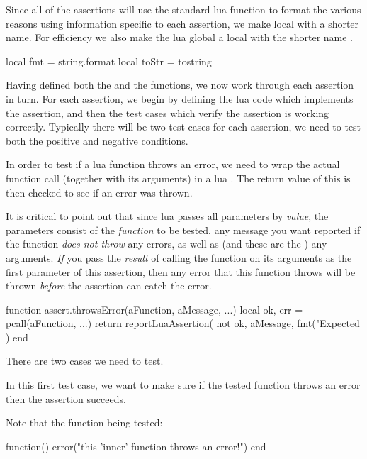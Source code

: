 Since all of the assertions will use the standard lua  
function to format the various reasons using information specific to each 
assertion, we make  local with a shorter name. For 
efficiency we also make the lua global  a local with the 
shorter name . 

\startLuaCode
local fmt   = string.format
local toStr = tostring
\stopLuaCode

Having defined both the  and the  
functions, we now work through each assertion in turn. For each assertion, 
we begin by defining the lua code which implements the assertion, and then 
the test cases which verify the assertion is working correctly. Typically 
there will be two test cases for each assertion, we need to test both the 
positive and negative conditions. 


In order to test if a lua function throws an error, we need to wrap the 
actual function call (together with its arguments) in a lua . 
The return value of this  is then checked to see if an error 
was thrown. 

It is critical to point out that since lua passes all parameters by 
\emph{value}, the  parameters consist of the 
\emph{function} to be tested, any message you want reported if the 
function \emph{does not throw} any errors, as well as (and these are the 
) any arguments. \emph{If} you pass the \emph{result} of 
calling the function on its arguments as the first parameter of this 
assertion, then any error that this function throws will be thrown 
\emph{before} the assertion can catch the error. 

\startLuaCode
function assert.throwsError(aFunction, aMessage, ...)
  local ok, err = pcall(aFunction, ...)
  return reportLuaAssertion(
    not ok,
    aMessage,
    fmt("Expected %
  )
end
\stopLuaCode

There are two cases we need to test.


In this first test case, we want to make sure if the tested function 
throws an error then the assertion succeeds.

Note that the function being tested: 

\starttyping[option=lua]
function()
  error("this 'inner' function throws an error!")
end
\stoptyping

